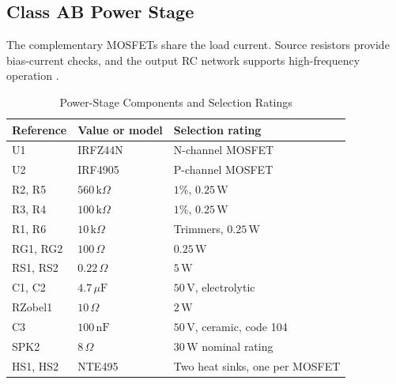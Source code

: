\documentclass[conference,letterpaper]{IEEEtran}
\newcommand{\Ohm}{\Omega}
\newcommand{\kohm}{\mathrm{k}\Omega}
\newcommand{\uF}{\mu\mathrm{F}}
\newcommand{\nF}{\mathrm{nF}}
\newcommand{\V}{\mathrm{V}}
\newcommand{\W}{\mathrm{W}}
\begin{document}
\subsection{Class AB Power Stage}
The complementary MOSFETs share the load current. Source resistors
provide bias-current checks, and the output RC network supports
high-frequency operation \cite{irfz44n,irf4905}.
\begin{table}[H]
\caption{Power-Stage Components and Selection Ratings}
\label{tab:components}
\centering\footnotesize
\begin{tabular}{@{}p{}p{}p{}@{}}
\toprule
Reference & Value or model & Selection rating\\
\midrule
U1 & IRFZ44N & N-channel MOSFET\\
U2 & IRF4905 & P-channel MOSFET\\
R2, R5 & $560\,\kohm$ & $1\%$, $0.25\,\W$\\
R3, R4 & $100\,\kohm$ & $1\%$, $0.25\,\W$\\
R1, R6 & $10\,\kohm$ & Trimmers, $0.25\,\W$\\
RG1, RG2 & $100\,\Ohm$ & $0.25\,\W$\\
RS1, RS2 & $0.22\,\Ohm$ & $5\,\W$\\
C1, C2 & $4.7\,\uF$ & $50\,\V$, electrolytic\\
RZobel1 & $10\,\Ohm$ & $2\,\W$\\
C3 & $100\,\nF$ & $50\,\V$, ceramic, code 104\\
SPK2 & $8\,\Ohm$ & $30\,\W$ nominal rating\\
HS1, HS2 & NTE495 & Two heat sinks, one per MOSFET\\
\bottomrule
\end{tabular}
\end{table}
\FloatBarrier
\end{document}
